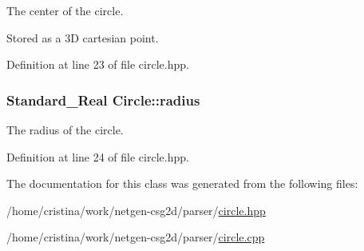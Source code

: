 The center of the circle. 

Stored as a 3D cartesian point. 

Definition at line 23 of file circle.hpp.

\hypertarget{class_circle_ab0935c62cf4fb06e85925a67f1fd7d1c}{
\subsubsection[{radius}]{\setlength{\rightskip}{0pt plus 5cm}Standard\_\-Real {\bf Circle::radius}}}
\label{class_circle_ab0935c62cf4fb06e85925a67f1fd7d1c}


The radius of the circle. 



Definition at line 24 of file circle.hpp.



The documentation for this class was generated from the following files:\begin{DoxyCompactItemize}
\item 
/home/cristina/work/netgen-\/csg2d/parser/\hyperlink{circle_8hpp}{circle.hpp}\item 
/home/cristina/work/netgen-\/csg2d/parser/\hyperlink{circle_8cpp}{circle.cpp}\end{DoxyCompactItemize}
